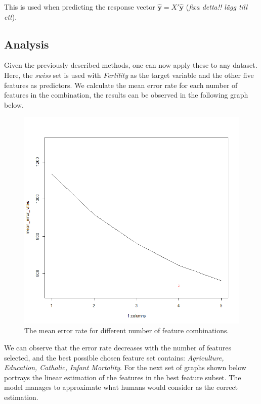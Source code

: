 \documentclass[a4paper, twocolumn]{article}
\begin{document}
            This is used when predicting the response vector $\hat{\mathbf{y}} = X' \hat{\mathbf{y}}$ (\emph{fixa detta!! lägg till ett}).

    \subsection*{Analysis}

        Given the previously described methods, one can now apply these to any dataset. Here, the \emph{swiss} set is used with \emph{Fertility} as the target variable and the other five features as predictors. We calculate the mean error rate for each number of features in the combination, the results can be observed in the following graph below.

        \begin{figure}[H]
        \centering
        \begin{minipage}[]{0.5\textwidth}
        \includegraphics[width=\textwidth]{share/Lab2A1_me_features.png}  
        \caption{The mean error rate for different number of feature combinations.\label{fig:features} }
        \end{minipage}
        \end{figure}

        We can observe that the error rate decreases with the number of features selected, and the best possible chosen feature set contains: \emph{Agriculture, Education, Catholic, Infant Mortality}. For the next set of graphs shown below portrays the linear estimation of the features in the best feature subset. The model manages to approximate what humans would consider as the correct estimation.
\end{document}
